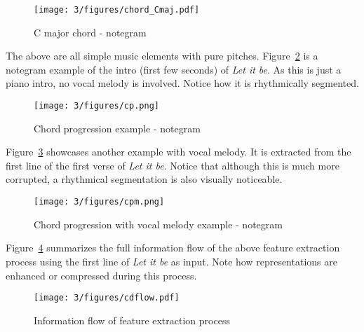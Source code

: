 \begin{figure}
\centering
\texttt{[image: 3/figures/chord\_Cmaj.pdf]}
\caption{C major chord - notegram}
\label{fig:3-chord_Cmaj}
\end{figure}

The above are all simple music elements with pure pitches. Figure~\ref{fig:3-cp} is a notegram example of the intro (first few seconds) of {\it Let it be}. As this is just a piano intro, no vocal melody is involved. Notice how it is rhythmically segmented.
\begin{figure}
\centering
\texttt{[image: 3/figures/cp.png]}
\caption{Chord progression example - notegram}
\label{fig:3-cp}
\end{figure}

Figure~\ref{fig:3-cpm} showcases another example with vocal melody. It is extracted from the first line of the first verse of {\it Let it be}. Notice that although this is much more corrupted, a rhythmical segmentation is also visually noticeable.
\begin{figure}
\centering
\texttt{[image: 3/figures/cpm.png]}
\caption{Chord progression with vocal melody example - notegram}
\label{fig:3-cpm}
\end{figure}

Figure~\ref{fig:3-cdflow} summarizes the full information flow of the above feature extraction process using the first line of {\it Let it be} as input. Note how representations are enhanced or compressed during this process.
\begin{figure}[h]
	\centering
	\texttt{[image: 3/figures/cdflow.pdf]}
	\caption{Information flow of feature extraction process}
	\label{fig:3-cdflow}
\end{figure}

